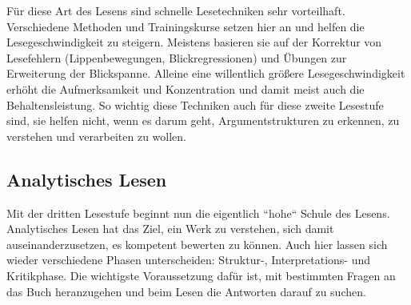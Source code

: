 \documentclass[]{book}
\theoremstyle{definition}
\theoremstyle{definition}
\theoremstyle{definition}
\theoremstyle{remark}
\begin{document}
Für diese Art des Lesens sind schnelle Lesetechniken sehr vorteilhaft.
Verschiedene Methoden und Trainingskurse setzen hier an und helfen die
Lesegeschwindigkeit zu steigern. Meistens basieren sie auf der Korrektur
von Lesefehlern (Lippenbewegungen, Blickregressionen) und Übungen zur
Erweiterung der Blickspanne. Alleine eine willentlich größere
Lesegeschwindigkeit erhöht die Aufmerksamkeit und Konzentration und
damit meist auch die Behaltensleistung. So wichtig diese Techniken auch
für diese zweite Lesestufe sind, sie helfen nicht, wenn es darum geht,
Argumentstrukturen zu erkennen, zu verstehen und verarbeiten zu wollen.

\subsection{Analytisches Lesen}\label{analytisches-lesen}

Mit der dritten Lesestufe beginnt nun die eigentlich ``hohe`` Schule des
Lesens. Analytisches Lesen hat das Ziel, ein Werk zu verstehen, sich
damit auseinanderzusetzen, es kompetent bewerten zu können. Auch hier
lassen sich wieder verschiedene Phasen unterscheiden: Struktur-,
Interpretations- und Kritikphase. Die wichtigste Voraussetzung dafür
ist, mit bestimmten Fragen an das Buch heranzugehen und beim Lesen die
Antworten darauf zu suchen.
\end{document}
